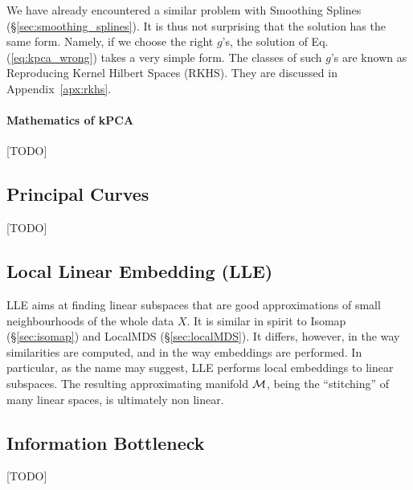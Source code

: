 We have already encountered a similar problem with Smoothing Splines (\S\ref{sec:smoothing_splines}). It is thus not surprising that the solution has the same form. 
Namely, if we choose the right $g$'s, the solution of Eq.(\ref{eq:kpca_wrong}) takes a very simple form. 
The classes of such $g$'s are known as Reproducing Kernel Hilbert Spaces (RKHS). 
They are discussed in Appendix~\ref{apx:rkhs}.



\paragraph{Mathematics of kPCA}
[TODO]



\subsection{Principal Curves}
[TODO]



\subsection{Local Linear Embedding (LLE)}
\label{sec:lle}

LLE aims at finding linear subspaces that are good approximations of small neighbourhoods of the whole data $X$.
It is similar in spirit to Isomap (\S\ref{sec:isomap}) and LocalMDS (\S\ref{sec:localMDS}).
It differs, however, in the way similarities are computed, and in the way embeddings are performed. 
In particular, as the name may suggest, LLE performs local embeddings to linear subspaces. The resulting approximating manifold $\mathcal{M}$, being the ``stitching'' of many linear spaces, is ultimately non linear.




\subsection{Information Bottleneck}
[TODO]

